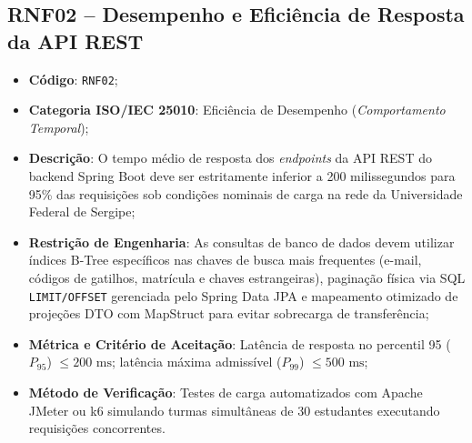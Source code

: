 \subsection{RNF02 -- Desempenho e Eficiência de Resposta da API REST}
\begin{itemize}
    \item \textbf{Código}: \texttt{RNF02};
    \item \textbf{Categoria ISO/IEC 25010}: Eficiência de Desempenho (\textit{Comportamento Temporal});
    \item \textbf{Descrição}: O tempo médio de resposta dos \textit{endpoints} da API REST do backend Spring Boot deve ser estritamente inferior a 200 milissegundos para 95\% das requisições sob condições nominais de carga na rede da Universidade Federal de Sergipe;
    \item \textbf{Restrição de Engenharia}: As consultas de banco de dados devem utilizar índices B-Tree específicos nas chaves de busca mais frequentes (e-mail, códigos de gatilhos, matrícula e chaves estrangeiras), paginação física via SQL \texttt{LIMIT/OFFSET} gerenciada pelo Spring Data JPA e mapeamento otimizado de projeções DTO com MapStruct para evitar sobrecarga de transferência;
    \item \textbf{Métrica e Critério de Aceitação}: Latência de resposta no percentil 95 ($P_{95}$) $\le 200\text{ ms}$; latência máxima admissível ($P_{99}$) $\le 500\text{ ms}$;
    \item \textbf{Método de Verificação}: Testes de carga automatizados com Apache JMeter ou k6 simulando turmas simultâneas de 30 estudantes executando requisições concorrentes.
\end{itemize}

